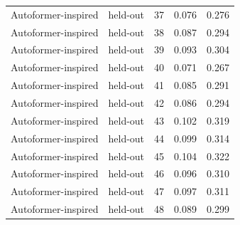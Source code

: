 \begin{tabular}{llrrr}
Autoformer-inspired & held-out & 37 & 0.076 & 0.276 \\
Autoformer-inspired & held-out & 38 & 0.087 & 0.294 \\
Autoformer-inspired & held-out & 39 & 0.093 & 0.304 \\
Autoformer-inspired & held-out & 40 & 0.071 & 0.267 \\
Autoformer-inspired & held-out & 41 & 0.085 & 0.291 \\
Autoformer-inspired & held-out & 42 & 0.086 & 0.294 \\
Autoformer-inspired & held-out & 43 & 0.102 & 0.319 \\
Autoformer-inspired & held-out & 44 & 0.099 & 0.314 \\
Autoformer-inspired & held-out & 45 & 0.104 & 0.322 \\
Autoformer-inspired & held-out & 46 & 0.096 & 0.310 \\
Autoformer-inspired & held-out & 47 & 0.097 & 0.311 \\
Autoformer-inspired & held-out & 48 & 0.089 & 0.299 \\
\bottomrule
\end{tabular}
